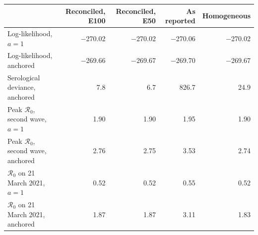 \begin{tabular}{lrrrr}
\toprule
 & Reconciled, E100 & Reconciled, E50 & As reported & Homogeneous \\
\midrule
Log-likelihood, $a=1$ & $-$270.02 & $-$270.02 & $-$270.06 & $-$270.02 \\
Log-likelihood, anchored & $-$269.66 & $-$269.67 & $-$269.70 & $-$269.67 \\
\addlinespace
Serological deviance, anchored & 7.8 & 6.7 & 826.7 & 24.9 \\
\addlinespace
Peak $\mathcal R_0$, second wave, $a=1$ & 1.90 & 1.90 & 1.95 & 1.90 \\
Peak $\mathcal R_0$, second wave, anchored & 2.76 & 2.75 & 3.53 & 2.74 \\
$\mathcal R_0$ on 21 March 2021, $a=1$ & 0.52 & 0.52 & 0.55 & 0.52 \\
$\mathcal R_0$ on 21 March 2021, anchored & 1.87 & 1.87 & 3.11 & 1.83 \\
\bottomrule
\end{tabular}
